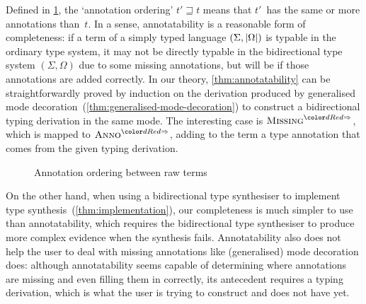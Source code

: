 Defined in \cref{fig:annotation-ordering}, the `annotation ordering' $t' \sqsupseteq t$ means that $t'$~has the same or more annotations than~$t$.
In a sense, annotatability is a reasonable form of completeness: if a term of a simply typed language $(\Sigma, \left|\Omega\right|)$ is typable in the ordinary type system, it may not be directly typable in the bidirectional type system $(\Sigma, \Omega)$ due to some missing annotations, but will be if those annotations are added correctly.
In our theory, \cref{thm:annotatability} can be straightforwardly proved by induction on the derivation produced by generalised mode decoration~(\cref{thm:generalised-mode-decoration}) to construct a bidirectional typing derivation in the same mode.
The interesting case is $\SynRule{Missing}$, which is mapped to $\SynRule{Anno}$, adding to the term a type annotation that comes from the given typing derivation.

\begin{figure}
  \centering\small
  \caption{Annotation ordering between raw terms}
  \label{fig:annotation-ordering}
\end{figure}
On the other hand, when using a bidirectional type synthesiser to implement type synthesis~(\cref{thm:implementation}), our completeness is much simpler to use than annotatability, which requires the bidirectional type synthesiser to produce more complex evidence when the synthesis fails.
Annotatability also does not help the user to deal with missing annotations like (generalised) mode decoration does: although annotatability seems capable of determining where annotations are missing and even filling them in correctly, its antecedent requires a typing derivation, which is what the user is trying to construct and does not have yet.
